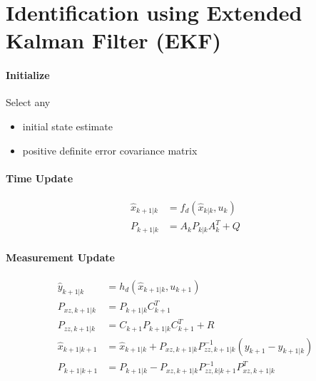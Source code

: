 	\section{Identification using Extended Kalman Filter (EKF)}
	
	\begin{tcolorbox}[title=DC Motor Parameters Identification with EKF]
		\paragraph{Initialize} Select any
		\begin{itemize}
			\item { initial state estimate}
			\item { positive definite error covariance matrix}
		\end{itemize}
		\paragraph{Time Update}
		\begin{equation}
			\begin{split}
				\hat{x}_{k+1|k} &= f_d(\hat{x}_{k|k},u_k)\\
				P_{k+1|k} &= A_kP_{k|k}A^T_k+Q
			\end{split}
			\label{dcmotorideq13}
		\end{equation}
		\paragraph{Measurement Update}
		\begin{equation}
			\begin{split}
				\hat{y}_{k+1|k} &= h_d(\hat{x}_{k+1|k},u_{k+1})\\
				P_{xz,k+1|k}    &= P_{k+1|k}C^T_{k+1}\\
				P_{zz,k+1|k}    &= C_{k+1}P_{k+1|k}C^T_{k+1}+R\\
				\hat{x}_{k+1|k+1} &= \hat{x}_{k+1|k} + P_{xz,k+1|k}P^{-1}_{zz,k+1|k}(y_{k+1}-\hat{y}_{k+1|k})\\
				P_{k+1|k+1}     &= P_{k+1|k} - P_{xz,k+1|k}P^{-1}_{zz,k|k+1}P^T_{xz,k+1|k} 
			\end{split}
			\label{dcmotorideq14}
		\end{equation}
	\end{tcolorbox}
	
	
